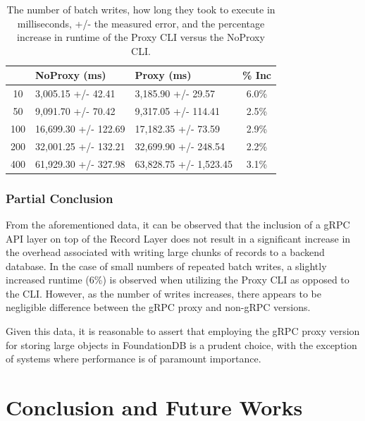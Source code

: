 \documentclass[sigconf]{acmart}
\begin{document}
\begin{table}[h]
\begin{tabular}{|c|l|l|c|}
    \hline
    \rowcolor[HTML]{656565} 
    \multicolumn{1}{|c}{\cellcolor[HTML]{656565}{\color[HTML]{FFFFFF} \textbf{N}}} &
    {\color[HTML]{FFFFFF} \textbf{NoProxy (ms)}} &
    {\color[HTML]{FFFFFF} \textbf{Proxy (ms)}} &
    {\color[HTML]{FFFFFF} \textbf{\% Inc}} \\ \hline
    10  & 3,005.15 +/- 42.41   & 3,185.90 +/- 29.57     & 6.0\% \\
    \rowcolor[HTML]{EFEFEF} 
    50  & 9,091.70 +/- 70.42   & 9,317.05 +/- 114.41    & 2.5\% \\
    100 & 16,699.30 +/- 122.69 & 17,182.35 +/- 73.59    & 2.9\% \\
    \rowcolor[HTML]{EFEFEF} 
    200 & 32,001.25 +/- 132.21 & 32,699.90 +/- 248.54   & 2.2\% \\
    400 & 61,929.30 +/- 327.98 & 63,828.75 +/- 1,523.45 & 3.1\% \\ \hline
\end{tabular}
\caption{The number of batch writes, how long they took to execute in milliseconds, +/- the measured error, and the percentage increase in runtime of the Proxy CLI versus the NoProxy CLI.}
\end{table}

\subsubsection{Partial Conclusion}

From the aforementioned data, it can be observed that the inclusion of a gRPC API layer on top of the Record Layer does not result in a significant increase in the overhead associated with writing large chunks of records to a backend database. In the case of small numbers of repeated batch writes, a slightly increased runtime (6\%) is observed when utilizing the Proxy CLI as opposed to the CLI. However, as the number of writes increases, there appears to be negligible difference between the gRPC proxy and non-gRPC versions.

Given this data, it is reasonable to assert that employing the gRPC proxy version for storing large objects in FoundationDB is a prudent choice, with the exception of systems where performance is of paramount importance.

\section{Conclusion and Future Works}
\end{document}
